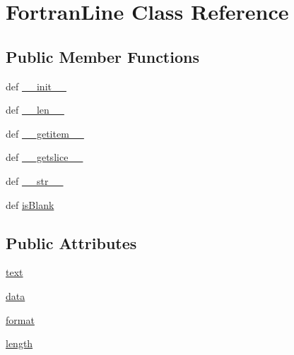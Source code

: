 \hypertarget{classpyneb_1_1utils_1_1_fortran_format_1_1_fortran_line}{\section{Fortran\-Line Class Reference}
\label{classpyneb_1_1utils_1_1_fortran_format_1_1_fortran_line}
}
\subsection*{Public Member Functions}
\begin{DoxyCompactItemize}
\item 
def \hyperlink{classpyneb_1_1utils_1_1_fortran_format_1_1_fortran_line_ac775ee34451fdfa742b318538164070e}{\-\_\-\-\_\-init\-\_\-\-\_\-}
\item 
def \hyperlink{classpyneb_1_1utils_1_1_fortran_format_1_1_fortran_line_af6412d48d9a71eac81e3195b52455aaa}{\-\_\-\-\_\-len\-\_\-\-\_\-}
\item 
def \hyperlink{classpyneb_1_1utils_1_1_fortran_format_1_1_fortran_line_a50d766f4276c3d8fe330ac8cd344a75f}{\-\_\-\-\_\-getitem\-\_\-\-\_\-}
\item 
def \hyperlink{classpyneb_1_1utils_1_1_fortran_format_1_1_fortran_line_a4a74e8137ffbf15dc30c0bf9e85dab6e}{\-\_\-\-\_\-getslice\-\_\-\-\_\-}
\item 
def \hyperlink{classpyneb_1_1utils_1_1_fortran_format_1_1_fortran_line_aa7a4b9bc0941308e362738503137460e}{\-\_\-\-\_\-str\-\_\-\-\_\-}
\item 
def \hyperlink{classpyneb_1_1utils_1_1_fortran_format_1_1_fortran_line_a1b6d819a71a8ed6d6c6dc2b5fc45179a}{is\-Blank}
\end{DoxyCompactItemize}
\subsection*{Public Attributes}
\begin{DoxyCompactItemize}
\item 
\hyperlink{classpyneb_1_1utils_1_1_fortran_format_1_1_fortran_line_af575f17e6be3f269b86b041a60560dbf}{text}
\item 
\hyperlink{classpyneb_1_1utils_1_1_fortran_format_1_1_fortran_line_a511ae0b1c13f95e5f08f1a0dd3da3d93}{data}
\item 
\hyperlink{classpyneb_1_1utils_1_1_fortran_format_1_1_fortran_line_a387137c43ed9616d39ba90e890d181eb}{format}
\item 
\hyperlink{classpyneb_1_1utils_1_1_fortran_format_1_1_fortran_line_af9d495c1655d813d553030485d00fea7}{length}
\end{DoxyCompactItemize}


